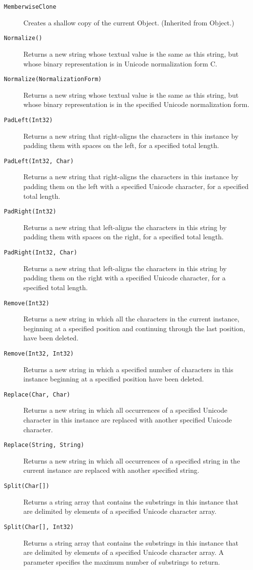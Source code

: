 \begin{description}
\item[\texttt{MemberwiseClone}] Creates a shallow copy of the current Object. (Inherited from Object.)
\item[\texttt{Normalize()}] Returns a new string whose textual value is the same as this string, but whose binary representation is in Unicode normalization form C.
\item[\texttt{Normalize(NormalizationForm)}] Returns a new string whose textual value is the same as this string, but whose binary representation is in the specified Unicode normalization form.
\item[\texttt{PadLeft(Int32)}] Returns a new string that right-aligns the characters in this instance by padding them with spaces on the left, for a specified total length.
\item[\texttt{PadLeft(Int32, Char)}] Returns a new string that right-aligns the characters in this instance by padding them on the left with a specified Unicode character, for a specified total length.
\item[\texttt{PadRight(Int32)}] Returns a new string that left-aligns the characters in this string by padding them with spaces on the right, for a specified total length.
\item[\texttt{PadRight(Int32, Char)}] Returns a new string that left-aligns the characters in this string by padding them on the right with a specified Unicode character, for a specified total length.
\item[\texttt{Remove(Int32)}] Returns a new string in which all the characters in the current instance, beginning at a specified position and continuing through the last position, have been deleted.
\item[\texttt{Remove(Int32, Int32)}] Returns a new string in which a specified number of characters in this instance beginning at a specified position have been deleted.
\item[\texttt{Replace(Char, Char)}] Returns a new string in which all occurrences of a specified Unicode character in this instance are replaced with another specified Unicode character.
\item[\texttt{Replace(String, String)}] Returns a new string in which all occurrences of a specified string in the current instance are replaced with another specified string.
\item[\texttt{Split(Char[])}] Returns a string array that contains the substrings in this instance that are delimited by elements of a specified Unicode character array.
\item[\texttt{Split(Char[], Int32)}] Returns a string array that contains the substrings in this instance that are delimited by elements of a specified Unicode character array. A parameter specifies the maximum number of substrings to return.

\end{description}
